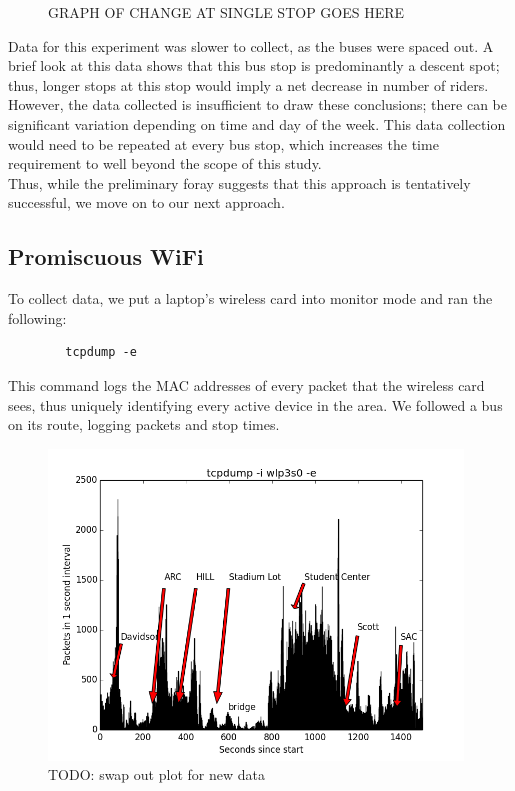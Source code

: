 \documentclass[letterpaper,abstract=on,titlepage=false]{scrreprt}
\begin{document}
	\begin{figure}[H]
	GRAPH OF CHANGE AT SINGLE STOP GOES HERE
	\centering
	\end{figure}

	Data for this experiment was slower to collect, as the buses were spaced out.
	A brief look at this data shows that this bus stop is predominantly a descent spot; thus, longer stops at this stop would imply a net decrease in number of riders.
	\\
	However, the data collected is insufficient to draw these conclusions; there can be significant variation depending on time and day of the week.
	This data collection would need to be repeated at every bus stop, which increases the time requirement to well beyond the scope of this study.
	\\
	Thus, while the preliminary foray suggests that this approach is tentatively successful, we move on to our next approach.
	
\subsection*{Promiscuous WiFi}
	To collect data, we put a laptop's wireless card into monitor mode and ran the following:
	\begin{verbatim}
		tcpdump -e
	\end{verbatim}
	This command logs the MAC addresses of every packet that the wireless card sees, thus uniquely identifying every active device in the area.
	We followed a bus on its route, logging packets and stop times.

	\begin{figure}[H]
	\includegraphics[width=11cm]{packets}
	\\TODO: swap out plot for new data
	\centering
	\end{figure}
\end{document}
